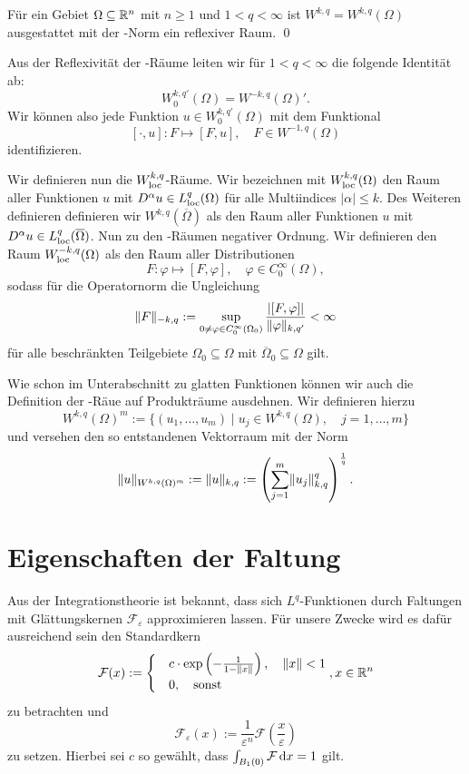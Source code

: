 \begin{lem}
  Für ein Gebiet $\Omega \subseteq \mathbb{R}^n$ mit $n \geq 1$ und $1 < q < \infty$ ist $W^{k,q} = W^{k,q}(\Omega)$ ausgestattet mit der \sobolev\hyp{}Norm ein reflexiver Raum. \qed
\end{lem}

Aus der Reflexivität der \sobolev\hyp{}Räume leiten wir für $1 < q < \infty$ die folgende Identität ab:
$$
  W_0^{k,q'}(\Omega) = W^{-k,q}(\Omega)'.
$$
Wir können also jede Funktion $u \in W_0^{k,q'}(\Omega)$ mit dem Funktional
$$
[\cdot, u] \colon F \mapsto [F, u], \quad F \in W^{-1,q}(\Omega)
$$
identifizieren.

Wir definieren nun die $W^{k,q}_{\operatorname{loc}}$\hyp{}Räume.
Wir bezeichnen mit $W^{k,q}_{\operatorname{loc}}(\Omega)$ den Raum aller Funktionen $u$ mit $D^\alpha u \in L^q_{\operatorname{loc}}(\Omega)$ für alle Multiindices $|\alpha| \leq k$.
Des Weiteren definieren definieren wir $W^{k,q}(\overline\Omega)$ als den Raum aller Funktionen $u$ mit $D^\alpha u \in L^q_{\operatorname{loc}}(\overline\Omega)$.
Nun zu den \sobolev\hyp{}Räumen negativer Ordnung. 
Wir definieren den Raum $W^{-k,q}_{\operatorname{loc}}(\Omega)$ als den Raum aller Distributionen
$$
F \colon \varphi \mapsto [F,\varphi], \quad \varphi \in C_0^\infty(\Omega),
$$
sodass für die Operatornorm die Ungleichung
$$
\lVert F \rVert_{-k,q} := \sup_{0 \neq \varphi \in C_0^\infty(\Omega_0)}  \frac{|[F,\varphi]|}{\lVert \varphi \rVert_{k,q'}} < \infty
$$
für alle beschränkten Teilgebiete $\Omega_0 \subseteq \Omega$ mit $\overline\Omega_0 \subseteq \Omega$ gilt.

Wie schon im Unterabschnitt zu glatten Funktionen können wir auch die Definition der \sobolev\hyp{}Räue auf Produkträume ausdehnen. 
Wir definieren hierzu
$$
W^{k,q}(\Omega)^m := \{ (u_1,\dots,u_m) \mid u_j \in W^{k,q}(\Omega), \quad j = 1,\dots, m\}
$$
und versehen den so entstandenen Vektorraum mit der Norm
$$
\lVert u \rVert_{W^{k,q}(\Omega)^m} 
:= \lVert u \rVert_{k,q}
:= \left( \sum_{j = 1}^m \lVert u_j \rVert_{k,q}^q \right)^{\frac{1}{q}}.
$$


\section{Eigenschaften der Faltung}
\label{subsec:mollification}

Aus der Integrationstheorie ist bekannt, dass sich $L^q$-Funktionen durch Faltungen mit Glättungskernen $\mathcal{F}_\varepsilon$ approximieren lassen.
Für unsere Zwecke wird es dafür ausreichend sein den Standardkern
$$
\mathcal{F}(x) := \begin{cases}
                     & c \cdot \exp\left(-\frac{1}{1 - \lVert x \rVert}\right), \quad \lVert x \rVert < 1 \\
                     & 0, \quad  \text{sonst}
                  \end{cases}, x \in \mathbb{R}^n
$$
zu betrachten und
$$
\mathcal{F}_\varepsilon(x) := \frac{1}{\varepsilon^n} \mathcal{F}\left(\frac{x}{\varepsilon}\right)
$$ 
zu setzen.
Hierbei sei $c$ so gewählt, dass $\int_{B_1(0)} \mathcal{F} \, {\operatorname{d}\!{x}} = 1$ gilt.

